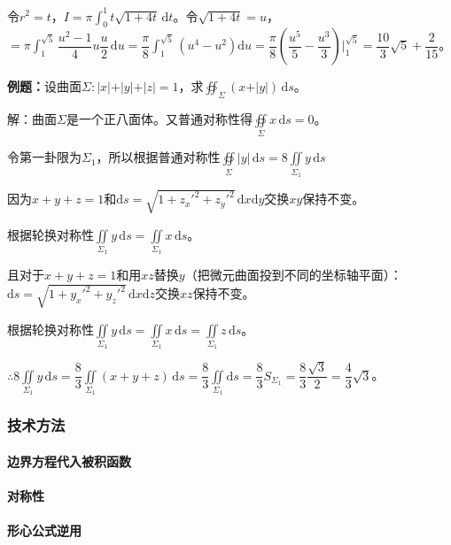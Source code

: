 令$r^2=t$，$I=\pi\int_0^1t\sqrt{1+4t}\,\textrm{d}t$。令$\sqrt{1+4t}=u$，$=\pi\int_1^{\sqrt{5}}\dfrac{u^2-1}{4}u\dfrac{u}{2}\,\textrm{d}u=\dfrac{\pi}{8}\int_1^{\sqrt{5}}(u^4-u^2)\textrm{d}u=\dfrac{\pi}{8}(\dfrac{u^5}{5}-\dfrac{u^3}{3})\bigg\vert_1^{\sqrt{5}}=\dfrac{10}{3}\sqrt{5}+\dfrac{2}{15}$。

\textbf{例题：}设曲面$\Sigma:\vert x\vert+\vert y\vert+\vert z\vert=1$，求$\oiint_\Sigma(x+\vert y\vert)\,\textrm{d}s$。

解：曲面$\Sigma$是一个正八面体。又普通对称性得$\oiint\limits_\Sigma x\,\textrm{d}s=0$。

令第一卦限为$\Sigma_1$，所以根据普通对称性$\oiint\limits_\Sigma\vert y\vert\,\textrm{d}s=8\iint\limits_{\Sigma_1}y\,\textrm{d}s$

因为$x+y+z=1$和$\textrm{d}s=\sqrt{1+z_x'^2+z_y'^2}\,\textrm{d}x\textrm{d}y$交换$xy$保持不变。

根据轮换对称性$\iint\limits_{\Sigma_1}y\,\textrm{d}s=\iint\limits_{\Sigma_1}x\,\textrm{d}s$。

且对于$x+y+z=1$和用$xz$替换$y$（把微元曲面投到不同的坐标轴平面）：$\textrm{d}s=\sqrt{1+y_x'^2+y_z'^2}\,\textrm{d}x\textrm{d}z$交换$xz$保持不变。

根据轮换对称性$\iint\limits_{\Sigma_1}y\,\textrm{d}s=\iint\limits_{\Sigma_1}x\,\textrm{d}s=\iint\limits_{\Sigma_1}z\,\textrm{d}s$。

$\therefore8\iint\limits_{\Sigma_1}y\,\textrm{d}s=\dfrac{8}{3}\iint\limits_{\Sigma_1}(x+y+z)\,\textrm{d}s=\dfrac{8}{3}\iint\limits_{\Sigma_1}\textrm{d}s=\dfrac{8}{3}S_{\Sigma_1}=\dfrac{8}{3}\dfrac{\sqrt{3}}{2}=\dfrac{4}{3}\sqrt{3}$。

\subsubsection{技术方法}

\paragraph{边界方程代入被积函数} \leavevmode \medskip

\paragraph{对称性} \leavevmode \medskip

\paragraph{形心公式逆用} \leavevmode \medskip

